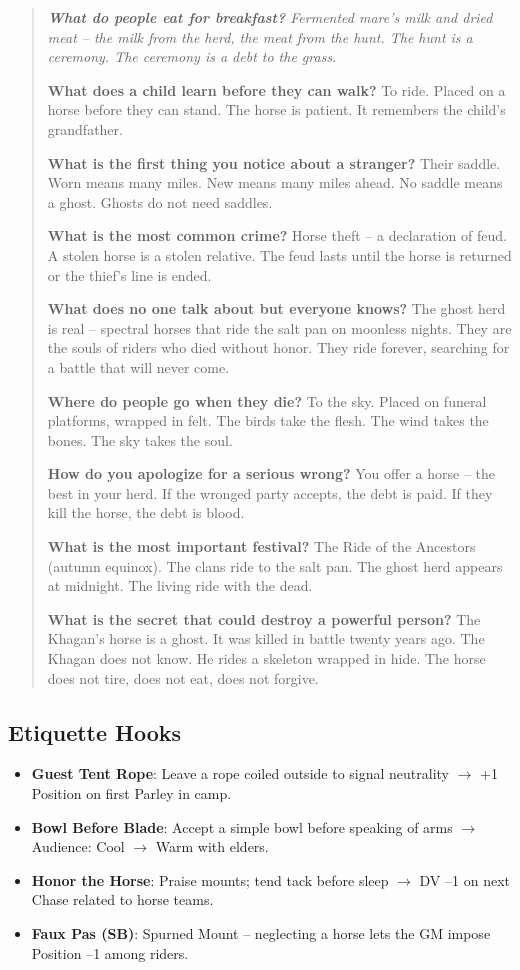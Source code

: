 \documentclass[12pt,oneside]{book}
\newenvironment{almanac}
  {\begin{quote}\small\itshape}
  {\end{quote}}
\begin{document}
\vspace{1em}
\begin{almanac}
\textbf{What do people eat for breakfast?} Fermented mare's milk and dried meat -- the milk from the herd, the meat from the hunt. The hunt is a ceremony. The ceremony is a debt to the grass.

\textbf{What does a child learn before they can walk?} To ride. Placed on a horse before they can stand. The horse is patient. It remembers the child's grandfather.

\textbf{What is the first thing you notice about a stranger?} Their saddle. Worn means many miles. New means many miles ahead. No saddle means a ghost. Ghosts do not need saddles.

\textbf{What is the most common crime?} Horse theft -- a declaration of feud. A stolen horse is a stolen relative. The feud lasts until the horse is returned or the thief's line is ended.

\textbf{What does no one talk about but everyone knows?} The ghost herd is real -- spectral horses that ride the salt pan on moonless nights. They are the souls of riders who died without honor. They ride forever, searching for a battle that will never come.

\textbf{Where do people go when they die?} To the sky. Placed on funeral platforms, wrapped in felt. The birds take the flesh. The wind takes the bones. The sky takes the soul.

\textbf{How do you apologize for a serious wrong?} You offer a horse -- the best in your herd. If the wronged party accepts, the debt is paid. If they kill the horse, the debt is blood.

\textbf{What is the most important festival?} The Ride of the Ancestors (autumn equinox). The clans ride to the salt pan. The ghost herd appears at midnight. The living ride with the dead.

\textbf{What is the secret that could destroy a powerful person?} The Khagan's horse is a ghost. It was killed in battle twenty years ago. The Khagan does not know. He rides a skeleton wrapped in hide. The horse does not tire, does not eat, does not forgive.
\end{almanac}

\subsection*{Etiquette Hooks}
\begin{itemize}
  \item \textbf{Guest Tent Rope}: Leave a rope coiled outside to signal neutrality $\rightarrow$ +1 Position on first Parley in camp.
  \item \textbf{Bowl Before Blade}: Accept a simple bowl before speaking of arms $\rightarrow$ Audience: Cool $\rightarrow$ Warm with elders.
  \item \textbf{Honor the Horse}: Praise mounts; tend tack before sleep $\rightarrow$ DV --1 on next Chase related to horse teams.
  \item \textbf{Faux Pas (SB)}: Spurned Mount -- neglecting a horse lets the GM impose Position --1 among riders.
\end{itemize}
\end{document}
